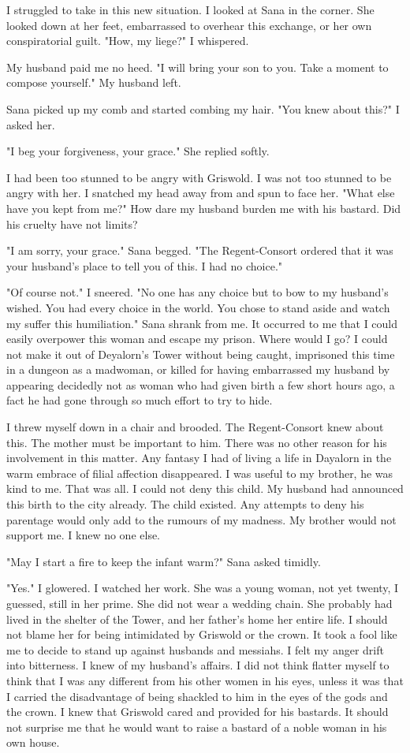 \documentclass{article}
\begin{document}
I struggled to take in this new situation. I looked at Sana in the corner. She looked down at her feet, embarrassed to overhear this exchange, or her own conspiratorial guilt. "How, my liege?" I whispered.

My husband paid me no heed. "I will bring your son to you. Take a moment to compose yourself." My husband left. 

Sana picked up my comb and started combing my hair. "You knew about this?" I asked her.

"I beg your forgiveness, your grace." She replied softly.

I had been too stunned to be angry with Griswold. I was not too stunned to be angry with her. I snatched my head away from and spun to face her. "What else have you kept from me?" How dare my husband burden me with his bastard. Did his cruelty have not limits?

"I am sorry, your grace." Sana begged. "The Regent-Consort ordered that it was your husband's place to tell you of this. I had no choice."

"Of course not." I sneered. "No one has any choice but to bow to my husband's wished. You had every choice in the world. You chose to stand aside and watch my suffer this humiliation." Sana shrank from me. It occurred to me that I could easily overpower this woman and escape my prison. Where would I go? I could not make it out of Deyalorn's Tower without being caught, imprisoned this time in a dungeon as a madwoman, or killed for having embarrassed my husband by appearing decidedly not as woman who had given birth a few short hours ago, a fact he had gone through so much effort to try to hide. 

I threw myself down in a chair and brooded. The Regent-Consort knew about this. The mother must be important to him. There was no other reason for his involvement in this matter. Any fantasy I had of living a life in Dayalorn in the warm embrace of filial affection disappeared. I was useful to my brother, he was kind to me. That was all. I could not deny this child. My husband had announced this birth to the city already. The child existed. Any attempts to deny his parentage would only add to the rumours of my madness. My brother would not support me. I knew no one else. 

"May I start a fire to keep the infant warm?" Sana asked timidly.

"Yes." I glowered. I watched her work. She was a young woman, not yet twenty, I guessed, still in her prime. She did not wear a wedding chain. She probably had lived in the shelter of the Tower, and her father's home her entire life. I should not blame her for being intimidated by Griswold or the crown. It took a fool like me to decide to stand up against husbands and messiahs. I felt my anger drift into bitterness. I knew of my husband's affairs. I did not think flatter myself to think that I was any different from his other women in his eyes, unless it was that I carried the disadvantage of being shackled to him in the eyes of the gods and the crown. I knew that Griswold cared and provided for his bastards. It should not surprise me that he would want to raise a bastard of a noble woman in his own house. 
\end{document}

